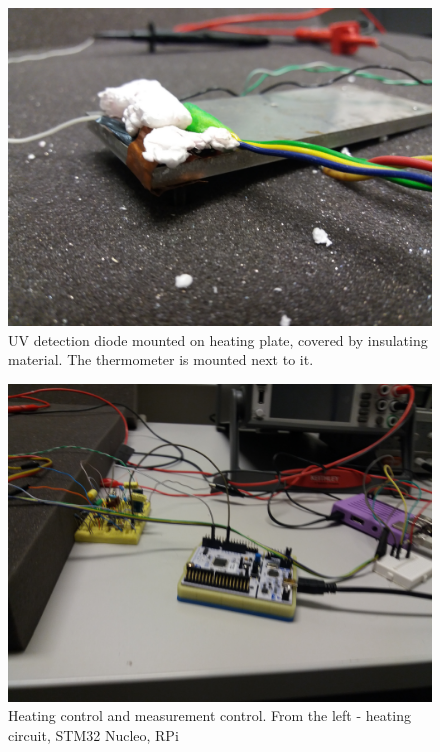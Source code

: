 \begin{figure}[H]
 \centering
 \includegraphics[scale=0.09, angle = 180]{./pictures/DiodeHeat}
 \caption{UV detection diode mounted on heating plate, covered by insulating material. The thermometer is mounted next to it.}
 \label{heatDiode}
\end{figure}


\begin{figure}[H]
 \centering
 \includegraphics[scale=0.09, angle = 180]{./pictures/heating}
 \caption{Heating control and measurement control. From the left - heating circuit, STM32 Nucleo, RPi}
 \label{heating}
\end{figure}



